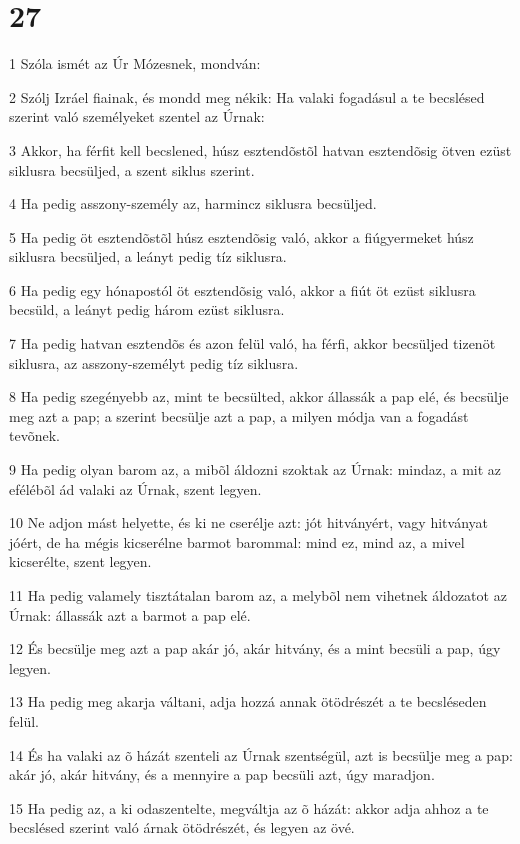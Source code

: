 \chapter{27}

\par 1 Szóla ismét az Úr Mózesnek, mondván:
\par 2 Szólj Izráel fiainak, és mondd meg nékik: Ha valaki fogadásul a te becslésed szerint való személyeket szentel az Úrnak:
\par 3 Akkor, ha férfit kell becslened, húsz esztendõstõl hatvan esztendõsig ötven ezüst siklusra becsüljed, a szent siklus szerint.
\par 4 Ha pedig asszony-személy az, harmincz siklusra becsüljed.
\par 5 Ha pedig öt esztendõstõl húsz esztendõsig való, akkor a fiúgyermeket húsz siklusra becsüljed, a leányt pedig tíz siklusra.
\par 6 Ha pedig egy hónapostól öt esztendõsig való, akkor a fiút öt ezüst siklusra becsüld, a leányt pedig három ezüst siklusra.
\par 7 Ha pedig hatvan esztendõs és azon felül való, ha férfi, akkor becsüljed tizenöt siklusra, az asszony-személyt pedig tíz siklusra.
\par 8 Ha pedig szegényebb az, mint te becsülted, akkor állassák a pap elé, és becsülje meg azt a pap; a szerint becsülje azt a pap, a milyen módja van a fogadást tevõnek.
\par 9 Ha pedig olyan barom az, a mibõl áldozni szoktak az Úrnak: mindaz, a mit az efélébõl ád valaki az Úrnak, szent legyen.
\par 10 Ne adjon mást helyette, és ki ne cserélje azt: jót hitványért, vagy hitványat jóért, de ha mégis kicserélne barmot barommal: mind ez, mind az, a mivel kicserélte, szent legyen.
\par 11 Ha pedig valamely tisztátalan barom az, a melybõl nem vihetnek áldozatot az Úrnak: állassák azt a barmot a pap elé.
\par 12 És becsülje meg azt a pap akár jó, akár hitvány, és a mint becsüli a pap, úgy legyen.
\par 13 Ha pedig meg akarja váltani, adja hozzá annak ötödrészét a te becsléseden felül.
\par 14 És ha valaki az õ házát szenteli az Úrnak szentségül, azt is becsülje meg a pap: akár jó, akár hitvány, és a mennyire a pap becsüli azt, úgy maradjon.
\par 15 Ha pedig az, a ki odaszentelte, megváltja az õ házát: akkor adja ahhoz a te becslésed szerint való árnak ötödrészét, és legyen az övé.
